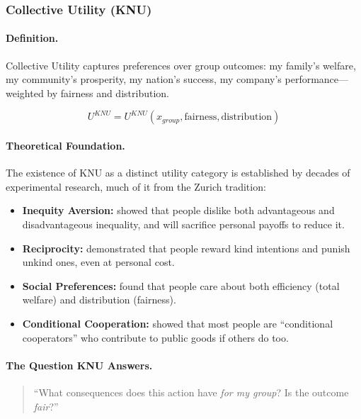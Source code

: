 \subsubsection{Collective Utility (KNU)}

\paragraph{Definition.}
Collective Utility captures preferences over group outcomes:
my family's welfare, my community's prosperity, my nation's success,
my company's performance---weighted by fairness and distribution.

\begin{equation}
U^{KNU} = U^{KNU}(x_{group}, \text{fairness}, \text{distribution})
\end{equation}

\paragraph{Theoretical Foundation.}
The existence of KNU as a distinct utility category is established by
decades of experimental research, much of it from the Zurich tradition:

\begin{itemize}
\item \textbf{Inequity Aversion:} \citet{fehr1999theory} showed that people 
dislike both advantageous and disadvantageous inequality, and will sacrifice 
personal payoffs to reduce it.

\item \textbf{Reciprocity:} \citet{falk2006theory} demonstrated that people 
reward kind intentions and punish unkind ones, even at personal cost.

\item \textbf{Social Preferences:} \citet{charness2002understanding} found that 
people care about both efficiency (total welfare) and distribution (fairness).

\item \textbf{Conditional Cooperation:} \citet{fischbacher2001people} showed that 
most people are ``conditional cooperators'' who contribute to public goods 
if others do too.
\end{itemize}

\paragraph{The Question KNU Answers.}
\begin{quote}
``What consequences does this action have \emph{for my group}?
Is the outcome \emph{fair}?''
\end{quote}

